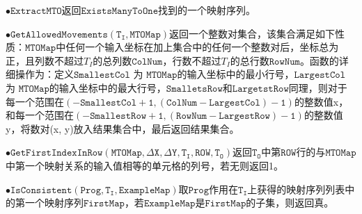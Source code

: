 \documentclass[design, pageheader]{njubachelor}
\begin{document}
$\bullet \mathtt{ExtractMTO}$返回$\mathtt{ExistsManyToOne}$找到的一个映射序列。

$\bullet \mathtt{GetAllowedMovements(T_{I}, MTOMap)}$返回一个整数对集合，该集合满足如下性质：$\mathtt{MTOMap}$中任何一个输入坐标在加上集合中的任何一个整数对后，坐标总为正，且列数不超过$T_{I}$的总列数$\mathtt{ColNum}$，行数不超过$T_{I}$的总行数$\mathtt{RowNum}$。函数的详细操作为：定义$\mathtt{SmallestCol}$ 为 $\mathtt{MTOMap}$的输入坐标中的最小行号，$\mathtt{LargestCol}$ 为 $\mathtt{MTOMap}$的输入坐标中的最大行号，$\mathtt{SmalletsRow}$和$\mathtt{LargetstRow}$同理，则对于每一个范围在$\mathtt{(-SmallestCol + 1, (ColNum - LargestCol) - 1)}$的整数值x，和每一个范围在$\mathtt{(-SmallestRow + 1, (RowNum - LargestRow) - 1)}$的整数值y，将数对(x, y)放入结果集合中，最后返回结果集合。

$\bullet \mathtt{GetFirstIndexInRow(MTOMap, \Delta X, \Delta Y, T_{I}, ROW, T_{O})}$返回$\mathtt{T_{O}}$中第$\mathtt{ROW}$行的与$\mathtt{MTOMap}$中第一个映射关系的输入值相等的单元格的列号，若无则返回1。

$\bullet \mathtt{IsConsistent(Prog, T_{I}, ExampleMap)}$取$\mathtt{Prog}$作用在$\mathtt{T_{I}}$上获得的映射序列列表中的第一个映射序列$\mathtt{FirstMap}$，若$\mathtt{ExampleMap}$是$\mathtt{FirstMap}$的子集，则返回真。
\end{document}
